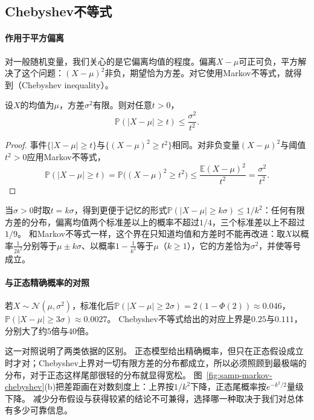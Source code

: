 \subsection{Chebyshev不等式}

\paragraph{作用于平方偏离}
对一般随机变量，我们关心的是它偏离均值的程度。偏离$X-\mu$可正可负，平方解决了这个问题：$(X-\mu)^2$非负，期望恰为方差。对它使用Markov不等式，就得到（Chebyshev inequality）。

\begin{theorem}[Chebyshev不等式]
\label{thm:samp-chebyshev}
设$X$的均值为$\mu$，方差$\sigma^2$有限。则对任意$t>0$，
\begin{equation}
  \mathbb{P}(|X-\mu|\geq t)\leq\frac{\sigma^2}{t^2}.
  \label{eq:probability-chebyshev-inequality}
\end{equation}
\end{theorem}

\begin{proof}
事件$\{|X-\mu|\geq t\}$与$\{(X-\mu)^2\geq t^2\}$相同。对非负变量$(X-\mu)^2$与阈值$t^2>0$应用Markov不等式，
\[
  \mathbb{P}(|X-\mu|\geq t)=\mathbb{P}\bigl((X-\mu)^2\geq t^2\bigr)\leq\frac{\mathbb{E}(X-\mu)^2}{t^2}=\frac{\sigma^2}{t^2}.
\]
\end{proof}

当$\sigma>0$时取$t=k\sigma$，得到更便于记忆的形式$\mathbb{P}(|X-\mu|\geq k\sigma)\leq1/k^2$：任何有限方差的分布，偏离均值两个标准差以上的概率不超过$1/4$，三个标准差以上不超过$1/9$。
和Markov不等式一样，这个界在只知道均值和方差时不能再改进：取$X$以概率$\frac1{2k^2}$分别等于$\mu\pm k\sigma$、以概率$1-\frac1{k^2}$等于$\mu$（$k\geq1$），它的方差恰为$\sigma^2$，并使等号成立。

\paragraph{与正态精确概率的对照}

\begin{example}[两个标准差与三个标准差]
\label{ex:samp-chebyshev-normal}
若$X\sim\mathcal N(\mu,\sigma^2)$，标准化后$\mathbb{P}(|X-\mu|\geq2\sigma)=2(1-\Phi(2))\approx0.046$，$\mathbb{P}(|X-\mu|\geq3\sigma)\approx0.0027$。
Chebyshev不等式给出的对应上界是$0.25$与$0.111$，分别大了约$5$倍与$40$倍。
\end{example}

这一对照说明了两类依据的区别。
正态模型给出精确概率，但只在正态假设成立时才对；Chebyshev上界对一切有限方差的分布都成立，所以必须照顾到最极端的分布，对于正态这样尾部很轻的分布就显得宽松。
图~\ref{fig:samp-markov-chebyshev}(b)把差距画在对数刻度上：上界按$1/k^2$下降，正态尾概率按$e^{-k^2/2}$量级下降。
减少分布假设与获得较紧的结论不可兼得，选择哪一种取决于我们对总体有多少可靠信息。


